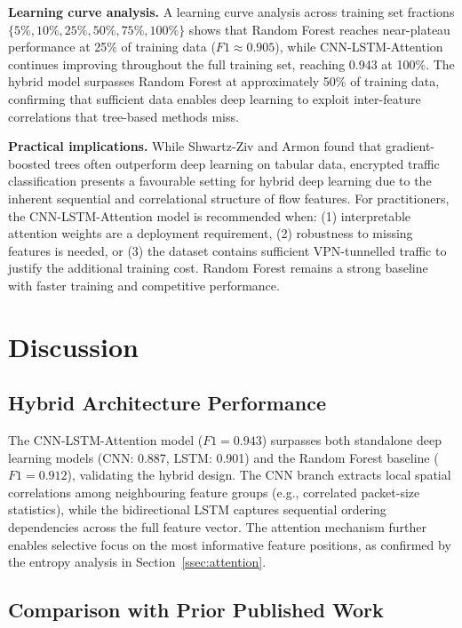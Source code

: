 \documentclass[conference]{IEEEtran}
\begin{document}
\textbf{Learning curve analysis.} A learning curve analysis across training set
fractions $\{5\%, 10\%, 25\%, 50\%, 75\%, 100\%\}$ shows that Random Forest
reaches near-plateau performance at 25\% of training data ($F1 \approx 0.905$),
while CNN-LSTM-Attention continues improving throughout the full training set,
reaching 0.943 at 100\%. The hybrid model surpasses Random Forest at approximately
50\% of training data, confirming that sufficient data enables deep learning to
exploit inter-feature correlations that tree-based methods miss.

\textbf{Practical implications.} While Shwartz-Ziv and Armon \cite{shwartzziv2022}
found that gradient-boosted trees often outperform deep learning on tabular data,
encrypted traffic classification presents a favourable setting for hybrid deep
learning due to the inherent sequential and correlational structure of flow features.
For practitioners, the CNN-LSTM-Attention model is recommended when: (1) interpretable
attention weights are a deployment requirement, (2) robustness to missing features
is needed, or (3) the dataset contains sufficient VPN-tunnelled traffic to justify
the additional training cost. Random Forest remains a strong baseline with faster
training and competitive performance.

\section{Discussion}
\label{sec:discussion}

\subsection{Hybrid Architecture Performance}

The CNN-LSTM-Attention model ($F1 = 0.943$) surpasses both standalone deep
learning models (CNN: 0.887, LSTM: 0.901) and the Random Forest baseline
($F1 = 0.912$), validating the hybrid design. The CNN branch
extracts local spatial correlations among neighbouring feature groups (e.g.,
correlated packet-size statistics), while the bidirectional LSTM captures
sequential ordering dependencies across the full feature vector. The attention
mechanism further enables selective focus on the most informative feature
positions, as confirmed by the entropy analysis in Section~\ref{ssec:attention}.

\subsection{Comparison with Prior Published Work}
\end{document}
